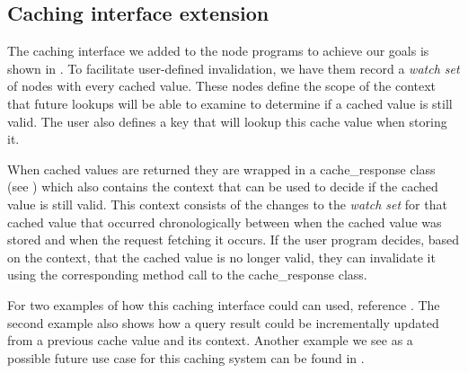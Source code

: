 \documentclass[letterpaper,twocolumn,11pt,tight]{article}
\begin{document}
\subsection{Caching interface extension}

The caching interface we added to the node programs to achieve our goals is shown in . To facilitate user-defined invalidation, we have them record a \emph{watch set} of nodes with every cached value. These nodes define the scope of the context that future lookups will be able to examine to determine if a cached value is still valid. 
The user also defines a key that will lookup this cache value when storing it.

    When cached values are returned they are wrapped in a cache\_response class (see ) which also contains the context that can be used to decide if the cached value is still valid.
This context consists of the changes to the \emph{watch set} for that cached value that occurred chronologically between when the cached value was stored and when the request fetching it occurs.
If the user program decides, based on the context, that the cached value is no longer valid, they can invalidate it using the corresponding method call to the cache\_response class.
    
    For two examples of how this caching interface could can used, reference . The second example also shows how a query result could be incrementally updated from a previous cache value and its context. Another example we see as a possible future use case for this caching system can be found in .
\end{document}
